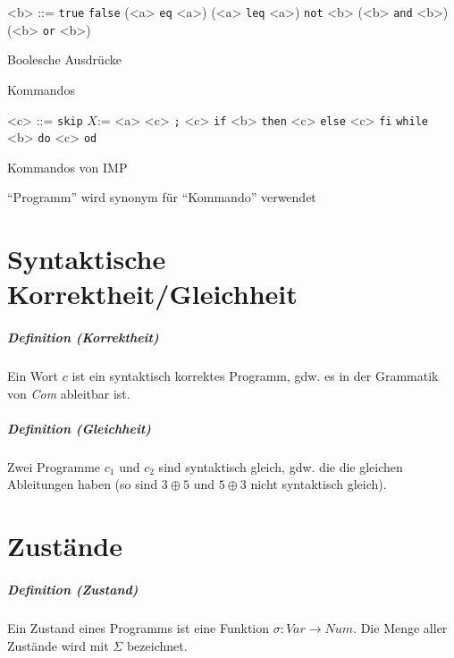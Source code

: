 \documentclass[a4paper, 11pt, accentcolor = tud3b]{tudreport}
\newcommand{\definition}[2]{\subparagraph{Definition (#1)} #2}
\begin{document}
\begin{description}[leftmargin = 2cm]
				    	\begin{description}[leftmargin = 3cm]
				    		\item[Definition:]
					    		\begin{grammar}
						    		<b> ::= \texttt{true}
							    		\alt \texttt{false}
							    		\alt (<a> \texttt{eq} <a>)
							    		\alt (<a> \texttt{leq} <a>)
							    		\alt \texttt{not} <b>
							    		\alt (<b> \texttt{and} <b>)
							    		\alt (<b> \texttt{or} <b>)
					    		\end{grammar}
				    		\item[Intuition:] Boolesche Ausdrücke
				    	\end{description}
			    	\item[\textit{Com}] Kommandos
				    	\begin{description}[leftmargin = 3cm]
				    		\item[Definition:]
					    		\begin{grammar}
							    	<c> ::= \texttt{skip}
								    	\alt $ X \texttt {:=} $ <a>
								    	\alt <c> \texttt{;} <c>
								    	\alt \texttt{if} <b> \texttt{then} <c> \texttt{else} <c> \texttt{fi}
								    	\alt \texttt{while} <b> \texttt{do} <c> \texttt{od}
					    		\end{grammar}
				    		\item[Intuition:] Kommandos von IMP
				    		\item[Konvention:] \enquote{Programm} wird synonym für \enquote{Kommando} verwendet
				    	\end{description}
			    \end{description}
	    
	    \section{Syntaktische Korrektheit/Gleichheit}
		    \definition{Korrektheit}{Ein Wort $ c $ ist ein syntaktisch korrektes Programm, gdw. es in der Grammatik von \textit{Com} ableitbar ist.}
		    
			\definition{Gleichheit}{Zwei Programme $ c _ 1 $ und $ c _ 2 $ sind syntaktisch gleich, gdw. die die gleichen Ableitungen haben (so sind $ 3 \oplus 5 $ und $ 5 \oplus 3 $ nicht syntaktisch gleich).}
	    
	    \section{Zustände}
		    \definition{Zustand}{Ein Zustand eines Programms ist eine Funktion $ \sigma : \textit{Var} \rightarrow \textit{Num} $. Die Menge aller Zustände wird mit $ \Sigma $ bezeichnet.}
		    
\end{document}
